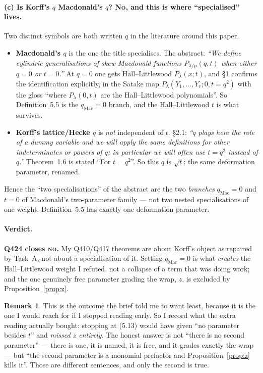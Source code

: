 \documentclass[11pt]{article}
\theoremstyle{definition}
\newtheorem{remark}[theorem]{Remark}
\begin{document}
\paragraph{(c) Is Korff's $q$ Macdonald's $q$? \textsc{No}, and this is where ``specialised'' lives.}
Two distinct symbols are both written $q$ in the literature around this paper.
\begin{itemize}
\item \textbf{Macdonald's $q$} is the one the title specialises.  The abstract:
  \emph{``We define cylindric generalisations of skew Macdonald functions
  $P_{\lambda/\mu}(q,t)$ when either $q=0$ or $t=0$.''}  At $q=0$ one gets
  Hall--Littlewood $P_\lambda(x;t)$, and \S1 confirms the identification explicitly, in
  the Satake map $P_\lambda(Y_1,\dots,Y_r;0,t=q^2)$ with the gloss ``where
  $P_\lambda(0,t)$ are the Hall--Littlewood polynomials''.  So Definition~5.5 is the
  $q_{\mathrm{Mac}}=0$ branch, and the Hall--Littlewood $t$ is what survives.
\item \textbf{Korff's lattice/Hecke $q$} is \emph{not} independent of $t$.  \S2.1:
  \emph{``$q$ plays here the role of a dummy variable and we will apply the same
  definitions for other indeterminates or powers of $q$; in particular we will often
  use $t=q^2$ instead of $q$.''}  Theorem~1.6 is stated ``For $t=q^2$''.  So this $q$
  is $\sqrt t$: the same deformation parameter, renamed.
\end{itemize}
Hence the ``two specialisations'' of the abstract are the two \emph{branches}
$q_{\mathrm{Mac}}=0$ and $t=0$ of Macdonald's two-parameter family --- not two nested
specialisations of one weight.  Definition~5.5 has exactly one deformation parameter.

\paragraph{Verdict.} \textbf{Q424 closes \textsc{no}.}  My Q410/Q417 theorems are about
Korff's object as repaired by Task~A, not about a specialisation of it.  Setting
$q_{\mathrm{Mac}}=0$ is what \emph{creates} the Hall--Littlewood weight I refuted, not a
collapse of a term that was doing work; and the one genuinely free parameter grading the
wrap, $z$, is excluded by Proposition~\ref{prop:z}.

\begin{remark}
This is the outcome the brief told me to want least, because it is the one I would reach
for if I stopped reading early.  So I record what the extra reading actually bought:
stopping at (5.13) would have given ``no parameter besides $t$'' and \emph{missed $z$
entirely}.  The honest answer is not ``there is no second parameter'' --- there is one,
it is named, it is free, and it grades exactly the wrap --- but ``the second parameter
is a monomial prefactor and Proposition~\ref{prop:z} kills it''.  Those are different
sentences, and only the second is true.
\end{remark}
\end{document}
